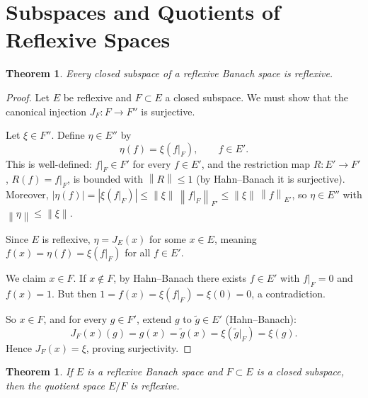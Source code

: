 \documentclass[a4paper,12pt]{book}
\newcommand{\norm}[1]{\left\| #1 \right\|}
\theoremstyle{definition}
\theoremstyle{plain}
\newtheorem{theorem}[definition]{Theorem}
\theoremstyle{remark}
\begin{document}
\section{Subspaces and Quotients of Reflexive Spaces}\label{sec:sub-quot-reflexive}

\begin{theorem}\label{thm:subspace-reflexive}
Every closed subspace of a reflexive Banach space is reflexive.
\end{theorem}

\begin{proof}
Let $E$ be reflexive and $F\subset E$ a closed subspace.  We must show that
the canonical injection $J_F: F\to F''$ is surjective.

Let $\xi\in F''$.  Define $\eta\in E''$ by
\[
  \eta(f) = \xi(f\big|_F), \qquad f\in E'.
\]
This is well-defined: $f\big|_F\in F'$ for every $f\in E'$, and the restriction
map $R:E'\to F'$, $R(f)=f\big|_F$, is bounded with $\norm{R}\le 1$
(by Hahn--Banach it is surjective).  Moreover,
$|\eta(f)| = |\xi(f\big|_F)| \le \norm{\xi}\,\norm{f\big|_F}_{F'}
\le \norm{\xi}\,\norm{f}_{E'}$,
so $\eta\in E''$ with $\norm{\eta}\le\norm{\xi}$.

Since $E$ is reflexive, $\eta = J_E(x)$ for some $x\in E$, meaning
$f(x) = \eta(f) = \xi(f\big|_F)$ for all $f\in E'$.

We claim $x\in F$.  If $x\notin F$, by Hahn--Banach there exists $f\in E'$
with $f\big|_F = 0$ and $f(x) = 1$.  But then
$1 = f(x) = \xi(f\big|_F) = \xi(0) = 0$, a contradiction.

So $x\in F$, and for every $g\in F'$, extend $g$ to $\tilde{g}\in E'$ (Hahn--Banach):
\[
  J_F(x)(g) = g(x) = \tilde{g}(x) = \xi(\tilde{g}\big|_F) = \xi(g).
\]
Hence $J_F(x) = \xi$, proving surjectivity.
\end{proof}

\begin{theorem}\label{thm:quotient-reflexive}
If $E$ is a reflexive Banach space and $F\subset E$ is a closed subspace,
then the quotient space $E/F$ is reflexive.
\end{theorem}
\end{document}
